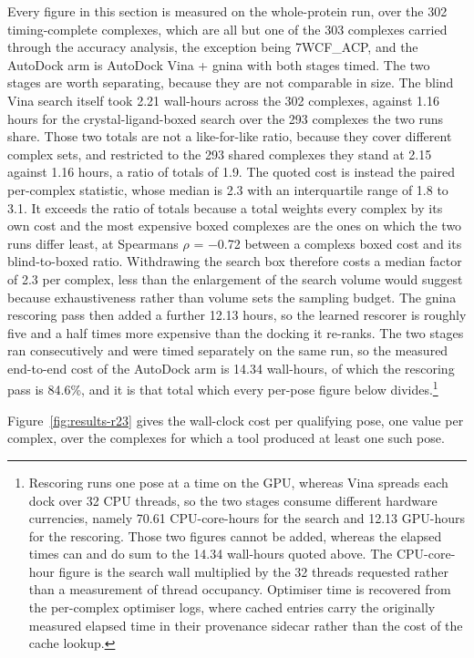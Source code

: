 Every figure in this section is measured on the whole-protein run, over the 302 timing-complete complexes, which are all but one of the 303 complexes carried through the accuracy analysis, the exception being 7WCF\_ACP, and the AutoDock arm is AutoDock Vina + gnina with both stages timed. The two stages are worth separating, because they are not comparable in size. The blind Vina search itself took 2.21 wall-hours across the 302 complexes, against 1.16 hours for the crystal-ligand-boxed search over the 293 complexes the two runs share. Those two totals are not a like-for-like ratio, because they cover different complex sets, and restricted to the 293 shared complexes they stand at 2.15 against 1.16 hours, a ratio of totals of 1.9. The quoted cost is instead the paired per-complex statistic, whose median is 2.3 with an interquartile range of 1.8 to 3.1. It exceeds the ratio of totals because a total weights every complex by its own cost and the most expensive boxed complexes are the ones on which the two runs differ least, at Spearman\textquotesingle s \ensuremath{\rho} = \ensuremath{-}0.72 between a complex\textquotesingle s boxed cost and its blind-to-boxed ratio. Withdrawing the search box therefore costs a median factor of 2.3 per complex, less than the enlargement of the search volume would suggest because exhaustiveness rather than volume sets the sampling budget. The gnina rescoring pass then added a further 12.13 hours, so the learned rescorer is roughly five and a half times more expensive than the docking it re-ranks. The two stages ran consecutively and were timed separately on the same run, so the measured end-to-end cost of the AutoDock arm is 14.34 wall-hours, of which the rescoring pass is 84.6\%, and it is that total which every per-pose figure below divides.\footnote{Rescoring runs one pose at a time on the GPU, whereas Vina spreads each dock over 32 CPU threads, so the two stages consume different hardware currencies, namely 70.61 CPU-core-hours for the search and 12.13 GPU-hours for the rescoring. Those two figures cannot be added, whereas the elapsed times can and do sum to the 14.34 wall-hours quoted above. The CPU-core-hour figure is the search wall multiplied by the 32 threads requested rather than a measurement of thread occupancy. Optimiser time is recovered from the per-complex optimiser logs, where cached entries carry the originally measured elapsed time in their provenance sidecar rather than the cost of the cache lookup.}

Figure~\ref{fig:results-r23} gives the wall-clock cost per qualifying pose, one value per complex, over the complexes for which a tool produced at least one such pose.

